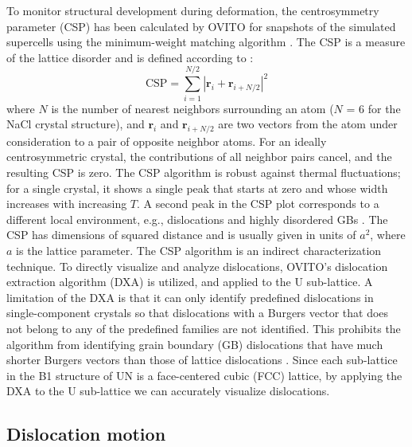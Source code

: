 \documentclass[applsci,article,submit,pdftex,moreauthors]{Definitions/mdpi}
\newcommand{\?}{\stackrel{?}{=}}
\begin{document}
To monitor structural development during deformation, the centrosymmetry parameter (CSP) has been calculated by OVITO for snapshots of the simulated supercells using the minimum-weight matching algorithm \cite{Larsen2020}. The CSP is a measure of the lattice disorder and is defined according to \cite{Kelchner1998}:
\begin{equation}
\mathrm{CSP} = \sum_{i=1}^{N/2} |\mathbf{r}_i + \mathbf{r}_{i+N/2}|^{2} 
\end{equation}
where $N$ is the number of nearest neighbors surrounding an atom ($N$ = 6 for the NaCl crystal structure), and $\mathbf{r}_i$ and $\mathbf{r}_{i+N/2}$ are two vectors from the atom under consideration to a pair of opposite neighbor atoms. For an ideally centrosymmetric crystal, the contributions of all neighbor pairs cancel, and the resulting CSP is zero. The CSP algorithm is robust against thermal fluctuations; for a single crystal, it shows a single peak that starts at zero and whose width increases with increasing $T$. A second peak in the CSP plot corresponds to a different local environment, e.g., dislocations and highly disordered GBs \cite{Bulatov2006, Larsen2020}. The CSP has dimensions of squared distance and is usually given in units of $a^2$, where $a$ is the lattice parameter. The CSP algorithm is an indirect characterization technique. To directly visualize and analyze dislocations, OVITO's dislocation extraction algorithm (DXA) \cite{Stukowski2012} is utilized, and applied to the U sub-lattice. A limitation of the DXA is that it can only identify predefined dislocations in single-component crystals so that dislocations with a Burgers vector that does not belong to any of the predefined families are not identified. This prohibits the algorithm from identifying grain boundary (GB) dislocations that have much shorter Burgers vectors than those of lattice dislocations \cite{Cai2016}. Since each sub-lattice in the B1 structure of UN is a face-centered cubic (FCC) lattice, by applying the DXA to the U sub-lattice we can accurately visualize dislocations. 

\subsection{Dislocation motion}
\end{document}
